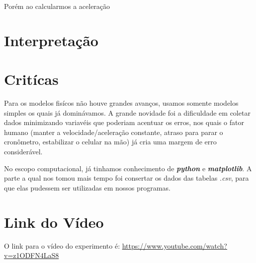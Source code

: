 \documentclass[a4paper, 12pt]{article}
\begin{document}
Porém ao calcularmos a aceleração

\section*{Interpretação}

\section*{Critícas}
Para os modelos fisícos não houve grandes avanços, usamos somente modelos
simples os quais já dominávamos. A grande novidade foi a dificuldade em coletar
dados minimizando variavéis que poderiam acentuar os erros, nos quais o fator
humano (manter a velocidade/aceleração constante, atraso para parar o
cronômetro, estabilizar o celular na mão) já cria uma margem de erro considerável. 

No escopo computacional, já tinhamos conhecimento de \textit{\textbf{python}} e
\textit{\textbf{matplotlib}}. A parte a qual nos tomou mais tempo foi consertar
os dados das tabelas \textit{.csv}, para que elas pudessem ser utilizadas em
nossos programas.

\section*{Link do Vídeo}
O link para o vídeo do experimento é:
\url{https://www.youtube.com/watch?v=z1ODFN4LaS8}
\end{document}

